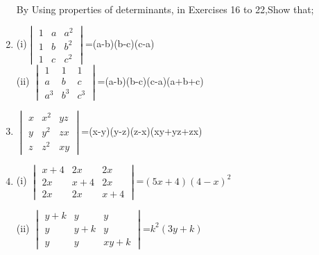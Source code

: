 \documentclass[journal,12pt,twocolumn]{IEEEtran}
\renewcommand\thesection{\arabic{section}}
\begin{document}
\begin{enumerate}[label=\thesection.\arabic*.,ref=\thesection.\theenumi]
\\
\solution 

By Using properties of determinants, in Exercises 16 to 22,Show that;
\item (i)$\begin{vmatrix}1&a&a^2\\1&b&b^2\\1&c&c^2\end{vmatrix}$=(a-b)(b-c)(c-a)\\
(ii) $\begin{vmatrix}1&1&1 \\ a&b&c \\ a^3&b^3&c^3\end{vmatrix}$=(a-b)(b-c)(c-a)(a+b+c)
\\
\solution 

\item $\begin{vmatrix}x&x^2&yz \\ y&y^2&zx \\ z&z^2&xy\end{vmatrix}$=(x-y)(y-z)(z-x)(xy+yz+zx)
\item (i) $\begin{vmatrix}x+4&2x&2x \\ 2x&x+4&2x \\ 2x&2x&x+4\end{vmatrix}$=$(5x+4)(4-x)^2$\\
\solution 

(ii) $\begin{vmatrix}y+k&y&y \\ y&y+k&y \\ y&y&xy+k\end{vmatrix}$=$k^2(3y+k)$
\\
\solution 



\end{enumerate}
\end{document}
